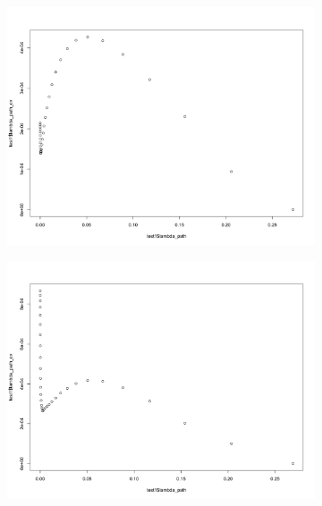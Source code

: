 \documentclass[letterpaper]{article}
\begin{document}
\begin{figure}[H]
\centering
\begin{subfigure}{0.5\textwidth}
  \centering
  \includegraphics[width=1\linewidth]{./result_plot/cv_square/9wrong_path_plot}
\end{subfigure}%
\begin{subfigure}{.5\textwidth}
  \centering
  \includegraphics[width=1\linewidth]{./result_plot/cv_square/10wrong_path_plot}
\end{subfigure}

\end{figure}
\end{document}
